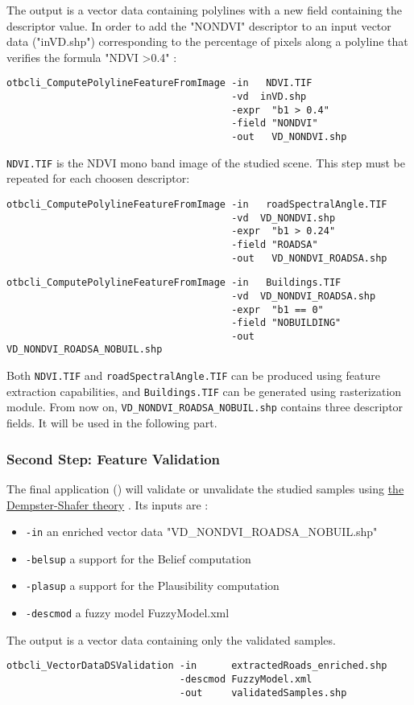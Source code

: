 The output is a vector data containing polylines with a new field containing
the descriptor value. In order to add the "NONDVI" descriptor to an input
vector data ("inVD.shp") corresponding to the percentage of pixels along a
polyline that verifies the formula "NDVI \textgreater 0.4" :

\begin{verbatim}
otbcli_ComputePolylineFeatureFromImage -in   NDVI.TIF
                                       -vd  inVD.shp
                                       -expr  "b1 > 0.4"
                                       -field "NONDVI"
                                       -out   VD_NONDVI.shp
\end{verbatim}

\verb?NDVI.TIF? is the NDVI mono band image of the studied scene.
This step must be repeated for each choosen descriptor:

\begin{verbatim}
otbcli_ComputePolylineFeatureFromImage -in   roadSpectralAngle.TIF
                                       -vd  VD_NONDVI.shp
                                       -expr  "b1 > 0.24"
                                       -field "ROADSA"
                                       -out   VD_NONDVI_ROADSA.shp
\end{verbatim}

\begin{verbatim}
otbcli_ComputePolylineFeatureFromImage -in   Buildings.TIF
                                       -vd  VD_NONDVI_ROADSA.shp
                                       -expr  "b1 == 0"
                                       -field "NOBUILDING"
                                       -out   VD_NONDVI_ROADSA_NOBUIL.shp
\end{verbatim}

Both \verb?NDVI.TIF? and \verb?roadSpectralAngle.TIF? can be produced
using \mont feature extraction capabilities, and \verb?Buildings.TIF?
can be generated using \mont rasterization module. From now on,
\verb?VD_NONDVI_ROADSA_NOBUIL.shp? contains three descriptor fields.
It will be used in the following part.

\subsubsection{Second Step: Feature Validation}

The final application () will
validate or unvalidate the studied samples using
\href{http://en.wikipedia.org/wiki/Dempster\%E2\%80\%93Shafer_theory}{the Dempster-Shafer theory}
. Its inputs are :
\begin{itemize}
\item \verb?-in? an enriched vector data "VD\_NONDVI\_ROADSA\_NOBUIL.shp"
\item \verb?-belsup? a support for the Belief computation
\item \verb?-plasup? a support for the Plausibility computation
\item \verb?-descmod? a fuzzy model FuzzyModel.xml
\end{itemize}
The output is a vector data containing only the validated samples.

\begin{verbatim}
otbcli_VectorDataDSValidation -in      extractedRoads_enriched.shp
                              -descmod FuzzyModel.xml
                              -out     validatedSamples.shp
\end{verbatim}
